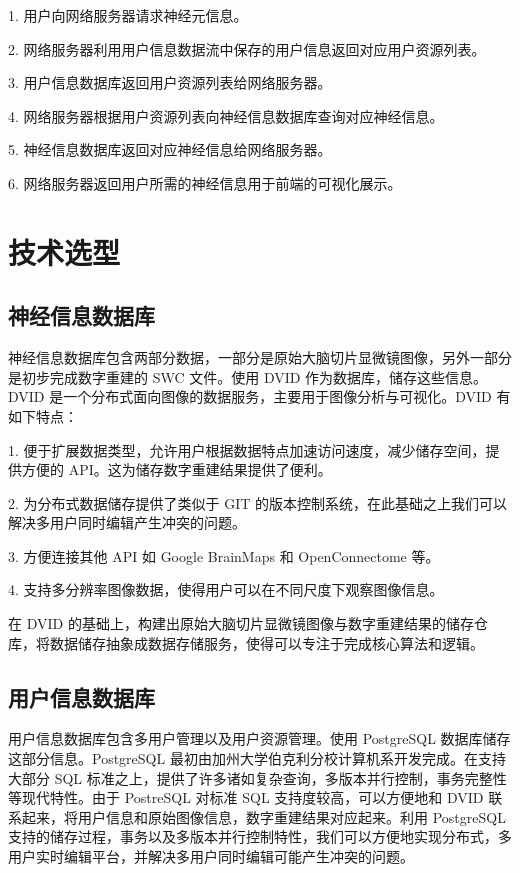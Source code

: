 1. 用户向网络服务器请求神经元信息。

2. 网络服务器利用用户信息数据流中保存的用户信息返回对应用户资源列表。

3. 用户信息数据库返回用户资源列表给网络服务器。

4. 网络服务器根据用户资源列表向神经信息数据库查询对应神经信息。

5. 神经信息数据库返回对应神经信息给网络服务器。

6. 网络服务器返回用户所需的神经信息用于前端的可视化展示。

\section{技术选型}

\subsection{神经信息数据库}
神经信息数据库包含两部分数据，一部分是原始大脑切片显微镜图像，另外一部分是初步完成数字重建的 SWC 文件。使用 DVID 作为数据库，储存这些信息。DVID 是一个分布式面向图像的数据服务，主要用于图像分析与可视化。DVID 有如下特点：

1. 便于扩展数据类型，允许用户根据数据特点加速访问速度，减少储存空间，提供方便的 API。这为储存数字重建结果提供了便利。

2. 为分布式数据储存提供了类似于 GIT 的版本控制系统，在此基础之上我们可以解决多用户同时编辑产生冲突的问题。

3. 方便连接其他 API 如 Google BrainMaps 和 OpenConnectome 等。

4. 支持多分辨率图像数据，使得用户可以在不同尺度下观察图像信息。

在 DVID 的基础上，构建出原始大脑切片显微镜图像与数字重建结果的储存仓库，将数据储存抽象成数据存储服务，使得可以专注于完成核心算法和逻辑。


\subsection{用户信息数据库}
用户信息数据库包含多用户管理以及用户资源管理。使用 PostgreSQL 数据库储存这部分信息。PostgreSQL 最初由加州大学伯克利分校计算机系开发完成。在支持大部分 SQL 标准之上，提供了许多诸如复杂查询，多版本并行控制，事务完整性等现代特性。由于 PostreSQL 对标准 SQL 支持度较高，可以方便地和 DVID 联系起来，将用户信息和原始图像信息，数字重建结果对应起来。利用 PostgreSQL 支持的储存过程，事务以及多版本并行控制特性，我们可以方便地实现分布式，多用户实时编辑平台，并解决多用户同时编辑可能产生冲突的问题。

